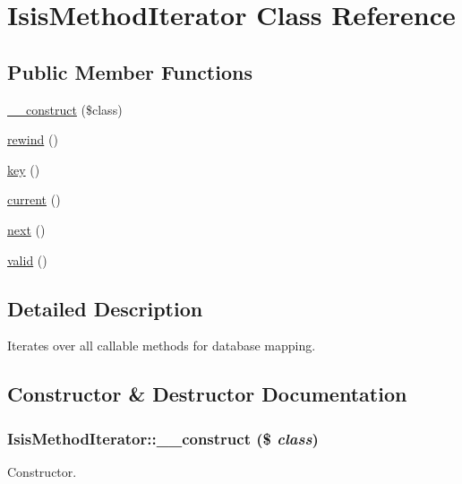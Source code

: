 \hypertarget{classIsisMethodIterator}{
\section{IsisMethodIterator Class Reference}
\label{classIsisMethodIterator}
}
\subsection*{Public Member Functions}
\begin{DoxyCompactItemize}
\item 
\hyperlink{classIsisMethodIterator_a1cf2e69c03a092839a2494264ca2ed07}{\_\-\_\-construct} (\$class)
\item 
\hyperlink{classIsisMethodIterator_a1a0ee1617a50e6aa57fe80cd0c2023df}{rewind} ()
\item 
\hyperlink{classIsisMethodIterator_ad750f5dd57dcb6480f64f9ac703492fc}{key} ()
\item 
\hyperlink{classIsisMethodIterator_a1d7236d349cd282c4c0ff6ec8f186e93}{current} ()
\item 
\hyperlink{classIsisMethodIterator_a8a02e17d6597ba1f199bd82ab9fc1b32}{next} ()
\item 
\hyperlink{classIsisMethodIterator_acb2ac4c3a336d9c6c25d97bd47f60759}{valid} ()
\end{DoxyCompactItemize}


\subsection{Detailed Description}
Iterates over all callable methods for database mapping. 

\subsection{Constructor \& Destructor Documentation}
\hypertarget{classIsisMethodIterator_a1cf2e69c03a092839a2494264ca2ed07}{
\subsubsection[{\_\-\_\-construct}]{\setlength{\rightskip}{0pt plus 5cm}IsisMethodIterator::\_\-\_\-construct (\$ {\em class})}}
\label{classIsisMethodIterator_a1cf2e69c03a092839a2494264ca2ed07}
Constructor.


